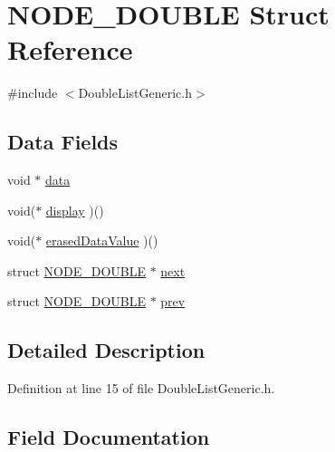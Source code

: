 \hypertarget{struct_n_o_d_e___d_o_u_b_l_e}{}\section{N\+O\+D\+E\+\_\+\+D\+O\+U\+B\+LE Struct Reference}
\label{struct_n_o_d_e___d_o_u_b_l_e}


{\ttfamily \#include $<$Double\+List\+Generic.\+h$>$}

\subsection*{Data Fields}
\begin{DoxyCompactItemize}
\item 
void $\ast$ \mbox{\hyperlink{struct_n_o_d_e___d_o_u_b_l_e_a735984d41155bc1032e09bece8f8d66d}{data}}
\item 
void($\ast$ \mbox{\hyperlink{struct_n_o_d_e___d_o_u_b_l_e_adf2a141d2970ba324b6576930959a524}{display}} )()
\item 
void($\ast$ \mbox{\hyperlink{struct_n_o_d_e___d_o_u_b_l_e_af74860f29ae9aa4b463e2378bcd7a298}{erased\+Data\+Value}} )()
\item 
struct \mbox{\hyperlink{struct_n_o_d_e___d_o_u_b_l_e}{N\+O\+D\+E\+\_\+\+D\+O\+U\+B\+LE}} $\ast$ \mbox{\hyperlink{struct_n_o_d_e___d_o_u_b_l_e_adc327993de0da387792f07a50b076143}{next}}
\item 
struct \mbox{\hyperlink{struct_n_o_d_e___d_o_u_b_l_e}{N\+O\+D\+E\+\_\+\+D\+O\+U\+B\+LE}} $\ast$ \mbox{\hyperlink{struct_n_o_d_e___d_o_u_b_l_e_ab2e51de298c76c1fb2c6851a07859ecd}{prev}}
\end{DoxyCompactItemize}


\subsection{Detailed Description}


Definition at line 15 of file Double\+List\+Generic.\+h.



\subsection{Field Documentation}
\mbox{\label{struct_n_o_d_e___d_o_u_b_l_e_a735984d41155bc1032e09bece8f8d66d}} 

